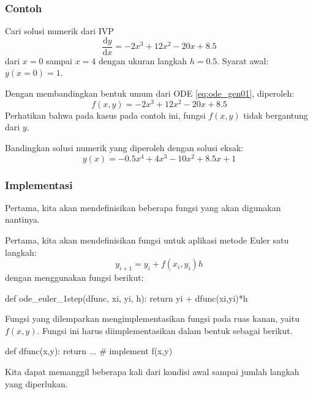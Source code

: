 
\begin{frame}
\frametitle{Contoh}
Cari solusi numerik dari IVP
\begin{equation*}
\frac{\mathrm{d}y}{\mathrm{d}x} = -2x^3 + 12x^2 - 20x + 8.5
\end{equation*}
dari $x = 0$ sampai $x = 4$ dengan ukuran langkah $h=0.5$.
Syarat awal: $y(x=0) = 1$.

Dengan membandingkan bentuk umum dari ODE \eqref{eq:ode_gen01}, diperoleh:
\begin{equation*}
f(x,y) = -2x^3 + 12x^2 - 20x + 8.5
\end{equation*}
Perhatikan bahwa pada kasus pada contoh ini, fungsi $f(x,y)$
tidak bergantung dari $y$.

Bandingkan solusi numerik yang diperoleh dengan solusi eksak:
\begin{equation*}
y(x) = -0.5x^4 + 4x^3 - 10x^2 + 8.5x + 1
\end{equation*}

\end{frame}



\begin{frame}[fragile]
\frametitle{Implementasi}

Pertama, kita akan mendefinisikan beberapa fungsi yang akan digunakan nantinya.

Pertama, kita akan mendefinisikan fungsi untuk aplikasi metode Euler satu langkah:
\begin{equation*}
y_{i+1} = y_{i} + f(x_i, y_i) h
\end{equation*}
dengan menggunakan fungsi berikut:
\begin{pythoncode}
def ode_euler_1step(dfunc, xi, yi, h):
    return yi + dfunc(xi,yi)*h
\end{pythoncode}

Fungsi yang dilemparkan  mengimplementasikan fungsi pada ruas kanan,
yaitu $f(x,y)$. Fungsi ini harus diimplementasikan dalam bentuk sebagai berikut.
\begin{pythoncode}
def dfunc(x,y):
    return ... # implement f(x,y)
\end{pythoncode}

Kita dapat memanggil  beberapa kali dari kondisi awal
sampai jumlah langkah yang diperlukan.

\end{frame}


